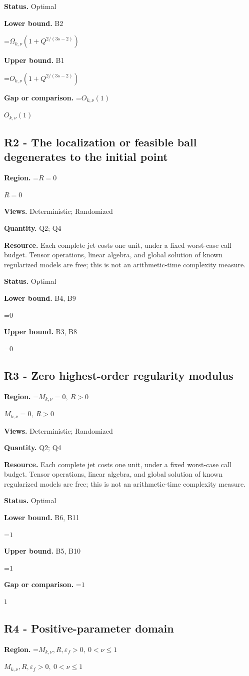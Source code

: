 \documentclass[10pt,a4paper]{article}
\newcommand{\AtlasMath}[1]{\par\begingroup\centering\setbox0=\hbox{$\displaystyle #1$}\ifdim\wd0>1.4\linewidth\typeout{ATLAS WIDE FORMULA: \the\wd0}\fi\ifdim\wd0>\linewidth\resizebox{\linewidth}{!}{\box0}\else\box0\fi\par\endgroup}
\newcommand{\AtlasInlineMath}[1]{\begingroup\setbox0=\hbox{$#1$}\ifdim\wd0>.4\linewidth\endgroup\AtlasMath{#1}\else\endgroup$#1$\fi}
\begin{document}
\textbf{Status.} Optimal

\textbf{Lower bound.} B2

\AtlasMath{\Omega_{k,\nu}(1+Q^{2/(3s-2)})}
\textbf{Upper bound.} B1

\AtlasMath{O_{k,\nu}(1+Q^{2/(3s-2)})}
\textbf{Gap or comparison.} \AtlasInlineMath{O_{k,\nu}(1)}

\subsection{R2 - The localization or feasible ball degenerates to the initial point}
\textbf{Region.} \AtlasInlineMath{R=0}

\textbf{Views.} Deterministic; Randomized

\textbf{Quantity.} Q2; Q4

\textbf{Resource.} Each complete jet costs one unit, under a fixed worst-case call budget. Tensor operations, linear algebra, and global solution of known regularized models are free; this is not an arithmetic-time complexity measure.

\textbf{Status.} Optimal

\textbf{Lower bound.} B4, B9

\AtlasMath{0}
\textbf{Upper bound.} B3, B8

\AtlasMath{0}
\subsection{R3 - Zero highest-order regularity modulus}
\textbf{Region.} \AtlasInlineMath{M_{k,\nu}=0,\ R>0}

\textbf{Views.} Deterministic; Randomized

\textbf{Quantity.} Q2; Q4

\textbf{Resource.} Each complete jet costs one unit, under a fixed worst-case call budget. Tensor operations, linear algebra, and global solution of known regularized models are free; this is not an arithmetic-time complexity measure.

\textbf{Status.} Optimal

\textbf{Lower bound.} B6, B11

\AtlasMath{1}
\textbf{Upper bound.} B5, B10

\AtlasMath{1}
\textbf{Gap or comparison.} \AtlasInlineMath{1}

\subsection{R4 - Positive-parameter domain}
\textbf{Region.} \AtlasInlineMath{M_{k,\nu},R,\varepsilon_f>0,\ 0<\nu\le1}
\end{document}
